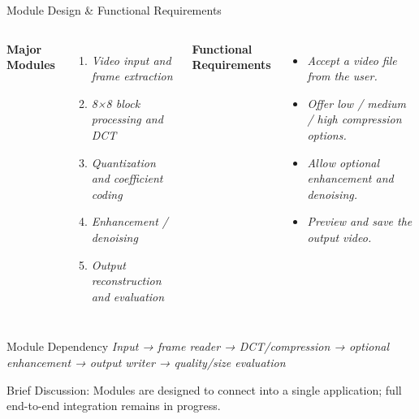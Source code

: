 \documentclass[aspectratio=169,11pt]{beamer}
\newcommand{\smallnote}[1]{%
\vspace{0.08cm}
{\scriptsize\color{GEUGrey}#1}
}
\newcommand{\placeholder}[1]{%
\textit{\color{GEUGrey}#1}
}
\begin{document}
\begin{frame}{Module Design \& Functional Requirements}
\small

\begin{columns}[T,totalwidth=\textwidth]


\textbf{\color{GEUBlue}Major Modules}

\begin{enumerate}\itemsep-2pt
\item \placeholder{ Video input and frame extraction}
\item \placeholder{8×8 block processing and DCT}
\item \placeholder{Quantization and coefficient coding}
\item \placeholder{Enhancement / denoising}
\item \placeholder{Output reconstruction and evaluation}
\end{enumerate}


\textbf{\color{GEUBlue}Functional Requirements}

\begin{itemize}\itemsep-2pt
\item \placeholder{Accept a video file from the user.}
\item \placeholder{Offer low / medium / high compression options.}
\item \placeholder{Allow optional enhancement and denoising.}
\item \placeholder{Preview and save the output video.}
\end{itemize}

\end{columns}

\vfill

\begin{block}{Module Dependency}
\placeholder{Input → frame reader → DCT/compression → optional enhancement → output writer → quality/size evaluation
}
\end{block}

\smallnote{
Brief Discussion: Modules are designed to connect into a single application; full end-to-end integration remains in progress.
}

\end{frame}
\end{document}
